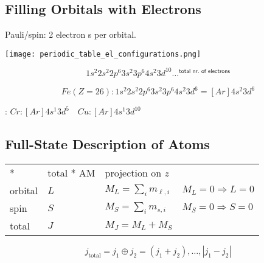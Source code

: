 
\subsection{Filling Orbitals with Electrons}
Pauli/spin: 2 electron s per orbital.


\texttt{[image: periodic\_table\_el\_configurations.png]}

\noindent\begin{equation*}
    1s^2 2s^2 2p^6 3s^2 3p^6 4s^2 3d^{10}\dots^{\textsf{total nr.\ of electrons}}
\end{equation*}

\noindent\begin{equation*}
    Fe(Z=26): 1s^2 2s^2 2p^6 3s^2 3p^6 4s^2 3d^6 = \left[Ar\right]4s^2 3d^6
\end{equation*}

: $Cr: \left[Ar\right]4s^1 3d^5 \quad Cu: \left[Ar\right]4s^1 3d^{10}$

\subsection{Full-State Description of Atoms}

\renewcommand{\arraystretch}{1.3}
\setlength{\oldtabcolsep}{\tabcolsep}\setlength\tabcolsep{6pt}

\begin{tabularx}{\linewidth}{@{}llll@{}}
    *       & total * AM & projection on $z$                                  \\
    \cmidrule{1-3}
    orbital & $L$        & $M_L=\sum_{i}m_{\ell,i}$ & $M_L=0 \Rightarrow L=0$ \\
    spin    & $S$        & $M_S=\sum_{i}m_{s,i}$    & $M_S=0 \Rightarrow S=0$ \\
    total   & $J$        & $M_J=M_L+M_S$
\end{tabularx}

\renewcommand{\arraystretch}{1}
\setlength\tabcolsep{\oldtabcolsep}

\begin{equation*}
    j_{\mathrm{total}} = j_1 \oplus j_2 = (j_1+j_2),\dots,|j_1-j_2|
\end{equation*}


